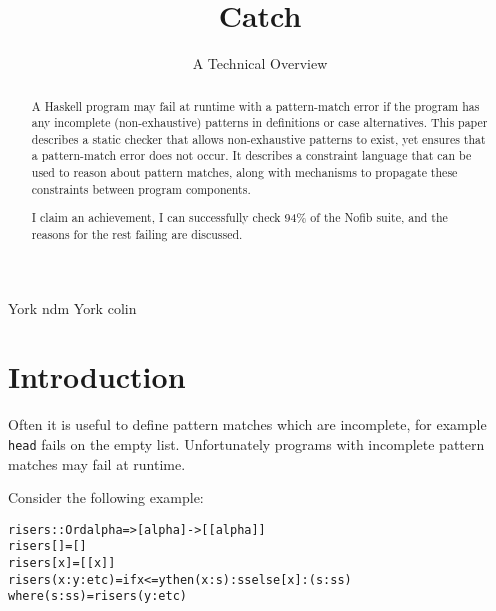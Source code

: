 \documentclass[preprint]{sigplanconf}
\newcommand{\T}[1]{\texttt{#1}}
\newenvironment{code}{\begin{alltt}\small}{\end{alltt}}
\begin{document}
\copyrightdata{[to be supplied]}

\titlebanner{\today{} - \currenttime{}}        %

\title{Catch}
\subtitle{A Technical Overview}

           {York}
           {ndm}
           {York}
           {colin}

\maketitle

\begin{abstract}
A Haskell program may fail at runtime with a pattern-match error if the program has any incomplete (non-exhaustive) patterns in definitions or case alternatives. This paper describes a static checker that allows non-exhaustive patterns to exist, yet ensures that a pattern-match error does not occur. It describes a constraint language that can be used to reason about pattern matches, along with mechanisms to propagate these constraints between program components.

I claim an achievement, I can successfully check 94\% of the Nofib suite, and the reasons for the rest failing are discussed.
\end{abstract}




\section{Introduction}
\label{sec:introduction}

Often it is useful to define pattern matches which are incomplete, for example \T{head} fails on the empty list. Unfortunately programs with incomplete pattern matches may fail at runtime.

Consider the following example:

\begin{code}
risers :: Ord alpha => [alpha] -> [[alpha]]
risers [] = []
risers [x] = [[x]]
risers (x:y:etc) = if x <= y then (x:s):ss else [x]:(s:ss)
    where (s:ss) = risers (y:etc)
\end{code}
\end{document}
